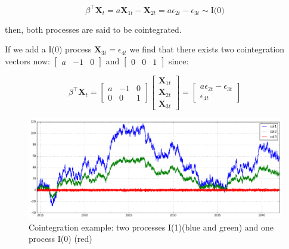 \[
\beta^\top \mathbf{X}_t = a \mathbf{X}_{1t} -\mathbf{X}_{2t} = 
a\epsilon_{2t} - \epsilon_{3t} \sim \text{I(0)}
\]

then, both processes are said to be cointegrated. 


If we add a I(0) process
$\mathbf{X}_{3t} = \epsilon_{4t}$  we find that there exists two cointegration
vectors now: $\begin{bmatrix}a &-1& 0\end{bmatrix}$ and $\begin{bmatrix}0
&0&1\end{bmatrix}$ since:

\[
\beta^\top \mathbf{X}_t = 
\begin{bmatrix}
a & -1 & 0 \\
0 & 0 & 1
\end{bmatrix} 
\begin{bmatrix} 
\mathbf{X}_{1t} \\
\mathbf{X}_{2t} \\
\mathbf{X}_{3t}
\end{bmatrix} = 
\begin{bmatrix}
a\epsilon_{2t} - \epsilon_{3t} \\
\epsilon_{4t}
\end{bmatrix}
\]



\begin{figure}[!h]
  \centering
  \includegraphics[width=\textwidth]{img/coint-example}
  \caption{Cointegration example: two processes I(1)(blue and green) and one process I(0) (red)}
  \label{fig:cointex}
\end{figure}

